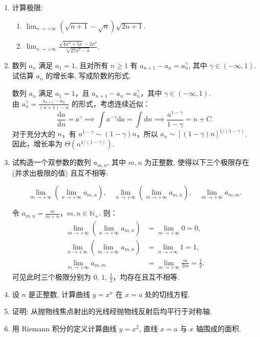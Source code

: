 \begin{enumerate}
    \item[1.]计算极限:
        \begin{enumerate}
            \item[(a)]$\displaystyle \lim_{n\to+\infty}(\sqrt{n + 1} -\sqrt{n})\sqrt{2n + 1}$.
            \item[(b)]$\displaystyle \lim_{n\to+\infty} \frac{\sqrt{4x^4+5x}-2x^2}{\sqrt[3]{27x^6-x}}$.
        \end{enumerate}
    
    \item[2.]数列 $a_{n}$ 满足 $a_{1} = 1$, 且对所有 $n \geq 1$ 有 $a_{n + 1} - a_{n} = a_{n}^{\gamma}$, 
    其中 $\gamma \in (-\infty , 1)$. 试估算 $a_{n}$ 的增长率, 写成阶数的形式.
    \begin{solution}
        数列 \(a_n\) 满足 \(a_1 = 1\)，且 \(a_{n+1} - a_n = a_n^\gamma\)，其中 \(\gamma \in (-\infty, 1)\).\\
        由 $\displaystyle a_{n}^\gamma=\frac{a_{n+1}-a_{n}}{(n+1)-n}$ 的形式，考虑连续近似：
        \[
        \frac{\mathrm{d}a}{\mathrm{d}n} = a^\gamma \implies \int a^{-\gamma} \mathrm{d}a = \int \mathrm{d}n \implies \frac{a^{1-\gamma}}{1-\gamma} = n + C.
        \]
        对于充分大的 \(n\)，有 \(a^{1-\gamma} \sim (1-\gamma)n\)，所以 \(a_n \sim [(1-\gamma)n]^{1/(1-\gamma)}\).\\
        因此，增长率为 \(\Theta(n^{1/(1-\gamma)})\).
    \end{solution}

    \item[3.]试构造一个双参数的数列 $a_{m,n}$, 其中 $m, n$ 为正整数, 使得以下三个极限存在 (并求出极限的值) 且互不相等:

    \[\lim_{m\to +\infty}\left(\lim_{n\to +\infty}a_{m,n}\right),\quad \lim_{n\to +\infty}
    \left(\lim_{m\to +\infty}a_{m,n}\right),\quad \lim_{m\to +\infty}a_{m,m}.\]

    \begin{solution}
        令 $\displaystyle a_{m,n} = \frac{m}{m+n}$，$m,n\in\mathbb{N}_{+}$. 则：
        \[
        \begin{aligned}
        \lim_{m \to +\infty} (\lim_{n \to +\infty} a_{m,n}) &= \lim_{m \to +\infty} 0 = 0, \\
        \lim_{n \to +\infty} (\lim_{m \to +\infty} a_{m,n}) &= \lim_{n \to +\infty} 1 = 1, \\
        \lim_{m \to +\infty} a_{m,m} &= \lim_{m \to +\infty} \frac{m}{2m} = \frac{1}{2}.
        \end{aligned}
        \]
        可见此时三个极限分别为 \(0\), \(1\), \(\displaystyle \frac{1}{2}\)，均存在且互不相等.
    \end{solution}

    \item[4.]设 $n$ 是正整数, 计算曲线 $y = x^{n}$ 在 $x = a$ 处的切线方程.

    \item[5.]证明: 从抛物线焦点射出的光线经抛物线反射后均平行于对称轴.

    \item[6.]用 Riemann 积分的定义计算曲线 $y = x^{2}$, 直线 $x = a$ 与 $x$ 轴围成的面积.
\end{enumerate}

